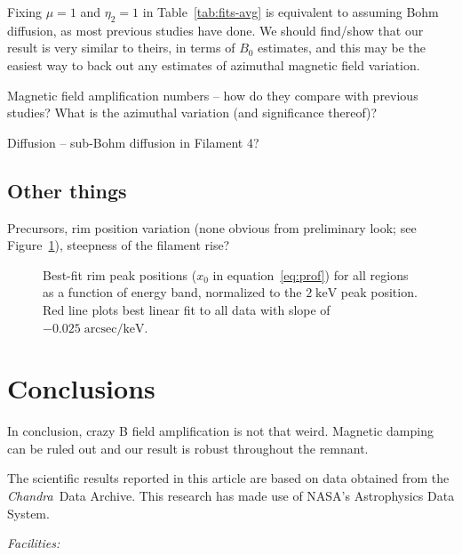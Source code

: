 \documentclass[iop, apj, numberedappendix, twocolappendix]{emulateapj}
\newcommand*{\mt}{\mathrm}
\newcommand*{\unit}[1]{\;\mt{#1}}  %
\newcommand*{\Chandra}{\textit{Chandra}\ }
\begin{document}
Fixing $\mu = 1$ and $\eta_2 = 1$ in Table~\ref{tab:fits-avg} is equivalent to
assuming Bohm diffusion, as most previous studies have done.
We should find/show that our result is very similar to theirs, in terms of
$B_0$ estimates, and this may be the easiest way to back out any estimates of
azimuthal magnetic field variation.

Magnetic field amplification numbers -- how do they compare with previous
studies?  What is the azimuthal variation (and significance thereof)?

Diffusion -- sub-Bohm diffusion in Filament 4?

\subsection{Other things}

Precursors, rim position variation (none obvious from preliminary look; see
Figure~\ref{fig:peak-pos}), steepness of the filament rise?

\begin{figure}
    \centering
    \caption{Best-fit rim peak positions ($x_0$ in equation~\eqref{eq:prof})
        for all regions as a function of energy band, normalized to the $2
        \unit{keV}$ peak position.  Red line plots best linear fit to all data
        with slope of $-0.025 \unit{arcsec/keV}$.
        \label{fig:peak-pos}}
\end{figure}

\section{Conclusions}

In conclusion, crazy B field amplification is not that weird.
Magnetic damping can be ruled out and our result is robust throughout the remnant.

\acknowledgments

The scientific results reported in this article are based on data obtained from
the \Chandra Data Archive.
This research has made use of NASA's Astrophysics Data System.

{\it Facilities:} 

\clearpage

\appendix

\setcounter{table}{0}
\renewcommand{\thetable}{A\arabic{table}}
\setcounter{figure}{0}
\renewcommand{\thefigure}{A\arabic{figure}}
\end{document}
